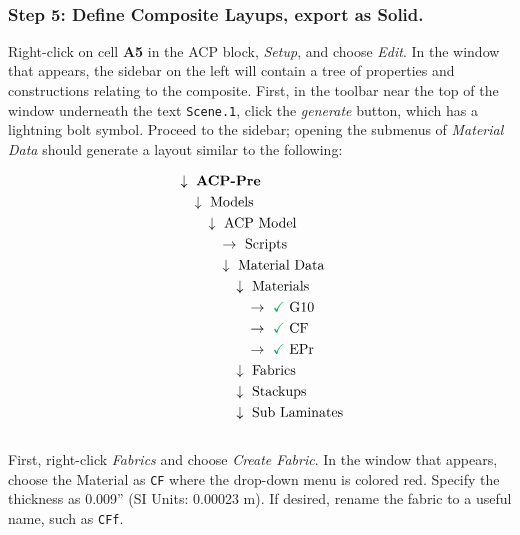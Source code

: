 \documentclass{amsdtx}
\begin{document}
~\subsubsection{Step 5: Define Composite Layups, export as Solid.}
Right-click on cell \textbf{A5} in the ACP block, \textit{Setup}, and choose \textit{Edit}. In the window that appears, the sidebar on the left will contain a tree of properties and constructions relating to the composite. First, in the toolbar near the top of the window underneath the text \texttt{Scene.1}, click the \textit{generate} button, which has a lightning bolt symbol. Proceed to the sidebar; opening the submenus of \textit{Material Data} should generate a layout similar to the following:~\\[-3em]
\begin{multicols}{2}
\begin{align*}
	&\downarrow ~\text{\bf ACP-Pre} \\
	&\quad \downarrow~\text{Models} \\
	&\quad\quad \downarrow~\text{ACP Model} \\
	&\quad\quad\quad \rightarrow~\text{Scripts} \\
	&\quad\quad\quad \downarrow~\text{Material Data} \\
	&\quad\quad\quad\quad \downarrow~\text{Materials} \\
	&\quad\quad\quad\quad\quad \rightarrow~{\color{Green}\checkmark}~\text{G10} \\
	&\quad\quad\quad\quad\quad \rightarrow~{\color{Green}\checkmark}~\text{CF} \\
	&\quad\quad\quad\quad\quad \rightarrow~{\color{Green}\checkmark}~\text{EPr} \\	
	&\quad\quad\quad\quad \downarrow~\text{Fabrics} \\
	&\quad\quad\quad\quad \downarrow~\text{Stackups} \\
	&\quad\quad\quad\quad \downarrow~\text{Sub Laminates} \\
\end{align*}
~\\[.5em]
First, right-click \textit{Fabrics} and choose \textit{Create Fabric}. In the window that appears, choose the Material as \verb|CF| where the drop-down menu is colored {\color{red} red}. Specify the thickness as 0.009'' (SI Units: 0.00023 m). If desired, rename the fabric to a useful name, such as \verb|CFf|.


\end{multicols}
\end{document}
